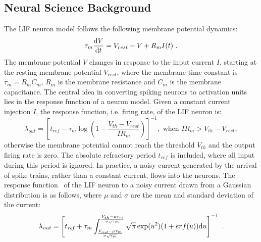 \subsection{Neural Science Background}
	The LIF neuron model follows the following membrane potential dynamics:
	\begin{equation}
	\tau_m \frac{\mathrm{d} V}{\mathrm{d} t}=V_{rest} - V + R_{m} I(t) ~.
	\label{eq:LIF_V}
	\end{equation}
	The membrane potential $V$ changes in response to the input current $I$, starting at the resting membrane potential $V_{rest}$, where the membrane time constant is $\tau_m = R_mC_m$, $R_m$ is the membrane resistance and $C_m$ is the membrane capacitance.
	The central idea in converting spiking neurons to activation units lies in the response function of a neuron model.
	Given a constant current injection $I$, the response function, i.e. firing rate, of the LIF neuron is:
	\begin{equation}
	\lambda_\mathit{out}=
	\left [ t_\mathit{ref}-\tau_m\log \left ( 1-\frac{V_{th}-V_\mathit{rest}}{IR_m}  \right )\right ]^{-1}, \textrm{~when~} IR_m>V_{th}-V_{rest},
	\label{equ:consI}
	\end{equation}
	otherwise the membrane potential cannot reach the threshold $V_{th}$ and the output firing rate is zero. 
	The absolute refractory period $t_\mathit{ref}$ is included, where all input during this period is ignored.
	In practice, a noisy current generated by the arrival of spike trains, rather than a constant current, flows into the neurons.
	The response function~\cite{la2008response}	of the LIF neuron to a noisy current drawn from a Gaussian distribution is as follows, where $\mu$ and $\sigma$ are the mean and standard deviation of the current:
	\begin{equation}
	\lambda_\mathit{out}=
	\left [ t_\mathit{ref}+\tau_m \int_{\frac{V_\mathit{rest}-\mu \tau_m }{\sigma \sqrt{\tau_m}}}^{\frac{V_{th}-\mu \tau_m }{\sigma \sqrt{\tau_m}}} \sqrt{\pi} \exp(u^{2}) (1+erf(u)) \mathrm{d} u \right ]^{-1} ~.
	\label{equ:noiseI}
	\end{equation}
	
